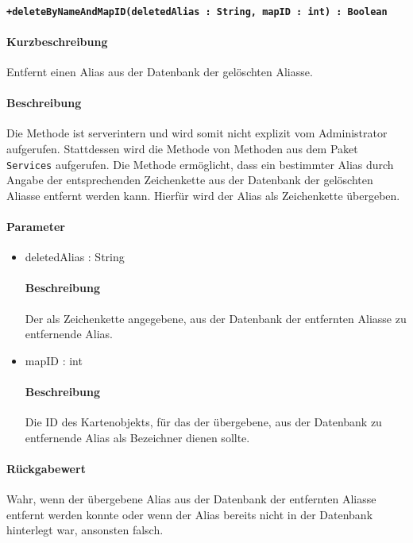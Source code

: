 \paragraph*{\texttt{+deleteByNameAndMapID(deletedAlias : String, mapID : int) : Boolean}}%
\paragraph*{Kurzbeschreibung}
Entfernt einen Alias aus der Datenbank der gelöschten Aliasse.
\paragraph*{Beschreibung}
Die Methode ist serverintern und wird somit nicht explizit vom Administrator aufgerufen.
Stattdessen wird die Methode von Methoden aus dem Paket \texttt{Services} aufgerufen.
Die Methode ermöglicht, dass ein bestimmter Alias durch Angabe der entsprechenden Zeichenkette aus der Datenbank der gelöschten Aliasse entfernt werden kann.
Hierfür wird der Alias als Zeichenkette übergeben.
\paragraph*{Parameter}
\begin{itemize}
    \item deletedAlias : String
    		\paragraph*{Beschreibung}
    		Der als Zeichenkette angegebene, aus der Datenbank der entfernten Aliasse zu entfernende Alias.
    	\item mapID : int
    		\paragraph*{Beschreibung}
    		Die ID des Kartenobjekts, für das der übergebene, aus der Datenbank zu entfernende Alias als Bezeichner dienen sollte.
\end{itemize}
\paragraph*{Rückgabewert}
Wahr, wenn der übergebene Alias aus der Datenbank der entfernten Aliasse entfernt werden konnte oder wenn der Alias bereits nicht in der Datenbank hinterlegt war, ansonsten falsch.
